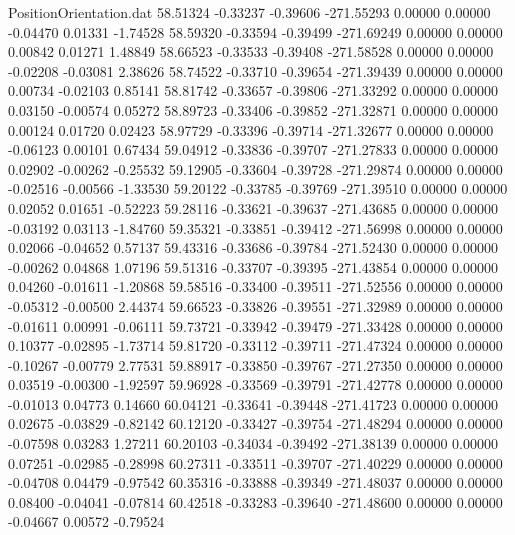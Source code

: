 \begin{filecontents}{PositionOrientation.dat}
  58.51324   -0.33237   -0.39606  -271.55293    0.00000    0.00000   -0.04470    0.01331   -1.74528
  58.59320   -0.33594   -0.39499  -271.69249    0.00000    0.00000    0.00842    0.01271    1.48849
  58.66523   -0.33533   -0.39408  -271.58528    0.00000    0.00000   -0.02208   -0.03081    2.38626
  58.74522   -0.33710   -0.39654  -271.39439    0.00000    0.00000    0.00734   -0.02103    0.85141
  58.81742   -0.33657   -0.39806  -271.33292    0.00000    0.00000    0.03150   -0.00574    0.05272
  58.89723   -0.33406   -0.39852  -271.32871    0.00000    0.00000    0.00124    0.01720    0.02423
  58.97729   -0.33396   -0.39714  -271.32677    0.00000    0.00000   -0.06123    0.00101    0.67434
  59.04912   -0.33836   -0.39707  -271.27833    0.00000    0.00000    0.02902   -0.00262   -0.25532
  59.12905   -0.33604   -0.39728  -271.29874    0.00000    0.00000   -0.02516   -0.00566   -1.33530
  59.20122   -0.33785   -0.39769  -271.39510    0.00000    0.00000    0.02052    0.01651   -0.52223
  59.28116   -0.33621   -0.39637  -271.43685    0.00000    0.00000   -0.03192    0.03113   -1.84760
  59.35321   -0.33851   -0.39412  -271.56998    0.00000    0.00000    0.02066   -0.04652    0.57137
  59.43316   -0.33686   -0.39784  -271.52430    0.00000    0.00000   -0.00262    0.04868    1.07196
  59.51316   -0.33707   -0.39395  -271.43854    0.00000    0.00000    0.04260   -0.01611   -1.20868
  59.58516   -0.33400   -0.39511  -271.52556    0.00000    0.00000   -0.05312   -0.00500    2.44374
  59.66523   -0.33826   -0.39551  -271.32989    0.00000    0.00000   -0.01611    0.00991   -0.06111
  59.73721   -0.33942   -0.39479  -271.33428    0.00000    0.00000    0.10377   -0.02895   -1.73714
  59.81720   -0.33112   -0.39711  -271.47324    0.00000    0.00000   -0.10267   -0.00779    2.77531
  59.88917   -0.33850   -0.39767  -271.27350    0.00000    0.00000    0.03519   -0.00300   -1.92597
  59.96928   -0.33569   -0.39791  -271.42778    0.00000    0.00000   -0.01013    0.04773    0.14660
  60.04121   -0.33641   -0.39448  -271.41723    0.00000    0.00000    0.02675   -0.03829   -0.82142
  60.12120   -0.33427   -0.39754  -271.48294    0.00000    0.00000   -0.07598    0.03283    1.27211
  60.20103   -0.34034   -0.39492  -271.38139    0.00000    0.00000    0.07251   -0.02985   -0.28998
  60.27311   -0.33511   -0.39707  -271.40229    0.00000    0.00000   -0.04708    0.04479   -0.97542
  60.35316   -0.33888   -0.39349  -271.48037    0.00000    0.00000    0.08400   -0.04041   -0.07814
  60.42518   -0.33283   -0.39640  -271.48600    0.00000    0.00000   -0.04667    0.00572   -0.79524

\end{filecontents}
